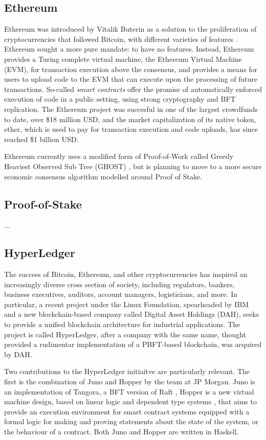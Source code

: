 \subsection{Ethereum}

Ethereum was introduced by Vitalik Buterin as a solution to the proliferation of cryptocurrencies that followed Bitcoin,
with different varieties of features \cite{buterin2013ethereum}.
Ethereum sought a more pure mandate: to have no features.
Instead, Ethereum provides a Turing complete virtual machine, the Ethereum Virtual Machine (EVM), for transaction execution above the consensus,
and provides a means for users to upload code to the EVM that can execute upon the processing of future transactions.
So-called \emph{smart contracts} \cite{} offer the promise of automatically enforced execution of code in a public setting, 
using strong cryptography and BFT replication. 
The Ethereum project was succesful in one of the largest crowdfunds to date, over \$18 million USD, 
and the market capitalization of its native token, ether, which is used to pay for transaction execution and code uploads,
has since reached \$1 billion USD.

Ethereum currently uses a modified form of Proof-of-Work called Greedy Heaviest Observed Sub Tree (GHOST) \cite{ghost},
but is planning to move to a more secure economic consensus algorithm modelled around Proof of Stake.

\subsection{Proof-of-Stake}
...

\subsection{HyperLedger}

The success of Bitcoin, Ethereum, and other cryptocurrencies has inspired an increasingly diverse cross section of society,
including regulators, bankers, business executives, auditors, account managers, logisticians, and more.
In particular, a recent project under the Linux Foundation, spearheaded by IBM and a new blockchain-based company called Digital Asset Holdings (DAH), 
seeks to provide a unified blockchain architecture for industrial applications. The project is called HyperLedger,
after a company with the same name, thought provided a rudimentar implementation of a PBFT-based blockchain, was acquired by DAH.

Two contributions to the HyperLedger initiaitve are particularly relevant.
The first is the combination of Juno and Hopper by the team at JP Morgan.
Juno is an implementation of Tangora, a BFT version of Raft \cite{tangora},
Hopper is a new virtual machine design,
based on linear logic \cite{girard1987linear} and dependent type systems \cite{bove2009dependent},
that aims to provide an execution environment for smart contract systems equipped with a formal logic
for making and proving statements about the state of the system, or the behaviour of a contract.
Both Juno and Hopper are written in Haskell.

